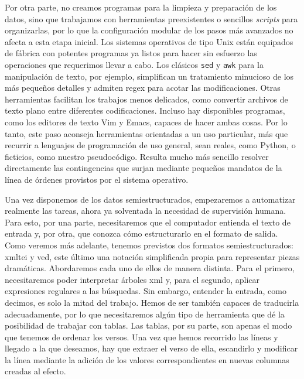 Por otra parte, no creamos programas para la limpieza y preparación de los datos, sino que trabajamos con herramientas preexistentes o sencillos \textit{scripts} para organizarlas, por lo que la configuración modular de los pasos más avanzados no afecta a esta etapa inicial. Los sistemas operativos de tipo Unix están equipados de fábrica con potentes programas ya listos para hacer sin esfuerzo las operaciones que requerimos llevar a cabo. Los clásicos \texttt{sed} y \texttt{awk} para la manipulación de texto, por ejemplo, simplifican un tratamiento minucioso de los más pequeños detalles y admiten \ac{regex} para acotar las modificaciones. Otras herramientas facilitan los trabajos menos delicados, como convertir archivos de texto plano entre diferentes codificaciones. Incluso hay disponibles programas, como los editores de texto Vim y Emacs, capaces de hacer ambas cosas. Por lo tanto, este paso aconseja herramientas orientadas a un uso particular, más que recurrir a lenguajes de programación de uso general, sean reales, como Python, o ficticios, como nuestro pseudocódigo. Resulta mucho más sencillo resolver directamente las contingencias que surjan mediante pequeños mandatos de la línea de órdenes provistos por el sistema operativo.

Una vez disponemos de los datos semiestructurados, empezaremos a automatizar realmente las tareas, ahora ya solventada la necesidad de supervisión humana. Para esto, por una parte, necesitaremos que el computador entienda el texto de entrada y, por otra, que conozca cómo estructurarlo en el formato de salida. Como veremos más adelante, tenemos previstos dos formatos semiestructurados: \ac{xmltei} y \ac{ved}, este último una notación simplificada propia para representar piezas dramáticas. Abordaremos cada uno de ellos de manera distinta. Para el primero, necesitaremos poder interpretar árboles \ac{xml} y, para el segundo, aplicar expresiones regulares a las búsquedas. Sin embargo, entender la entrada, como decimos, es solo la mitad del trabajo. Hemos de ser también capaces de traducirla adecuadamente, por lo que necesitaremos algún tipo de herramienta que dé la posibilidad de trabajar con tablas. Las tablas, por su parte, son apenas el modo que tenemos de ordenar los versos. Una vez que hemos recorrido las líneas y llegado a la que deseamos, hay que extraer el verso de ella, escandirlo y modificar la línea mediante la adición de los valores correspondientes en nuevas columnas creadas al efecto.
 
